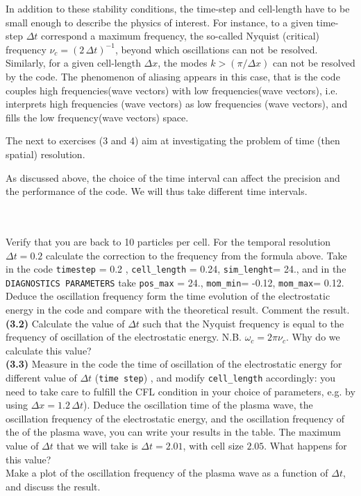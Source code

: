 \documentclass[11pt,a4paper]{article}
\begin{document}
In addition to these stability conditions, the time-step and cell-length have to be small enough to describe the physics of interest. For instance, to a given time-step $\Delta t$ correspond a maximum frequency, the so-called Nyquist (critical) frequency $\nu_c =(2\,\Delta t)^{-1}$, beyond which oscillations can not be resolved. Similarly, for a given cell-length $\Delta x$, the modes $k>(\pi/\Delta x)$ can not be resolved by the code.  The phenomenon of aliasing appears in this case, that is the code couples high frequencies(wave vectors)  with low frequencies(wave vectors), i.e. interprets high frequencies (wave vectors) as low frequencies (wave vectors), and fills the low frequency(wave vectors) space. 

The next to exercises (3 and 4) aim at investigating the problem of time (then spatial) resolution. 

As discussed above, the choice of the time interval can affect the precision and the performance of the code. We will thus take different time intervals. 

$ $\\
\\
 Verify that you are back to 10 particles per cell. For the temporal resolution $\Delta t = 0.2$ calculate the correction to the frequency from the formula above.  Take in the code \texttt{timestep} = 0.2 , \texttt{cell\_length} = 0.24, \texttt{sim\_lenght}= 24., and in the \texttt{DIAGNOSTICS PARAMETERS} take   \texttt{pos\_max} = 24., \texttt{mom\_min}= -0.12, \texttt{mom\_max}= 0.12.   Deduce the oscillation frequency form the time evolution of the electrostatic energy in the code and compare with the theoretical result. Comment the result. \\
{\bf (3.2)} Calculate the value of $\Delta t $ such that the Nyquist frequency is equal to the frequency of oscillation of the electrostatic energy. N.B. $\omega_c = 2 \pi \nu_c$. Why do we calculate this value? \\
{\bf (3.3)} Measure in the code  the time of oscillation of the electrostatic energy for different value of $\Delta t$ (\texttt{time step}) , and modify \texttt{cell\_length} accordingly: you need to take care to fulfill the CFL condition in your choice of parameters, e.g. by using $\Delta x = 1.2\,\Delta t$). Deduce the oscillation time of the plasma wave, the oscillation frequency of the electrostatic energy, and the oscillation frequency of the of the plasma wave, you can write your results in the table. The maximum value of $\Delta t $ that we will take is $\Delta t = 2.01$, with cell size $2.05$. What happens for this value? \\
 Make a plot of the oscillation frequency of the plasma wave as a function of $\Delta t$, and discuss the result. \\
\end{document}
